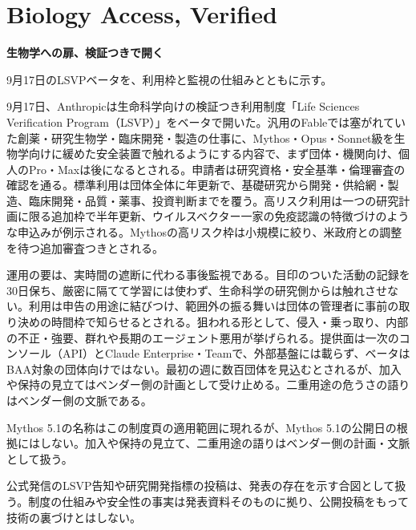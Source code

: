 \section{Biology Access, Verified}
\begin{wideflow}
{\Large\bfseries 生物学への扉、検証つきで開く}\par
\smallskip
{\color{SurveyMuted}9月17日のLSVPベータを、利用枠と監視の仕組みとともに示す。}\par
\end{wideflow}

9月17日、Anthropicは生命科学向けの検証つき利用制度「Life Sciences Verification Program（LSVP）」をベータで開いた\cite{lsvp}。汎用のFableでは塞がれていた創薬・研究生物学・臨床開発・製造の仕事に、Mythos・Opus・Sonnet級を生物学向けに緩めた安全装置で触れるようにする内容で、まず団体・機関向け、個人のPro・Maxは後になるとされる。申請者は研究資格・安全基準・倫理審査の確認を通る。標準利用は団体全体に年更新で、基礎研究から開発・供給網・製造、臨床開発・品質・薬事、投資判断までを覆う。高リスク利用は一つの研究計画に限る追加枠で半年更新、ウイルスベクター一家の免疫認識の特徴づけのような申込みが例示される。Mythosの高リスク枠は小規模に絞り、米政府との調整を待つ追加審査つきとされる。

運用の要は、実時間の遮断に代わる事後監視である\cite{lsvp}。目印のついた活動の記録を30日保ち、厳密に隔てて学習には使わず、生命科学の研究側からは触れさせない。利用は申告の用途に結びつけ、範囲外の振る舞いは団体の管理者に事前の取り決めの時間枠で知らせるとされる。狙われる形として、侵入・乗っ取り、内部の不正・強要、群れや長期のエージェント悪用が挙げられる。提供面は一次のコンソール（API）とClaude Enterprise・Teamで、外部基盤には載らず、ベータはBAA対象の団体向けではない。最初の週に数百団体を見込むとされるが、加入や保持の見立てはベンダー側の計画として受け止める。二重用途の危うさの語りはベンダー側の文脈である。

\begin{claimboundary}[制度と公開日の境界]
Mythos 5.1の名称はこの制度頁の適用範囲に現れるが、Mythos 5.1の公開日の根拠にはしない。加入や保持の見立て、二重用途の語りはベンダー側の計画・文脈として扱う。
\end{claimboundary}

\begin{communitynote}
公式発信のLSVP告知や研究開発指標の投稿は、発表の存在を示す合図として扱う\cite{w38x-lsvp-off,w38x-rdi-off}。制度の仕組みや安全性の事実は発表資料そのものに拠り、公開投稿をもって技術の裏づけとはしない。
\end{communitynote}
